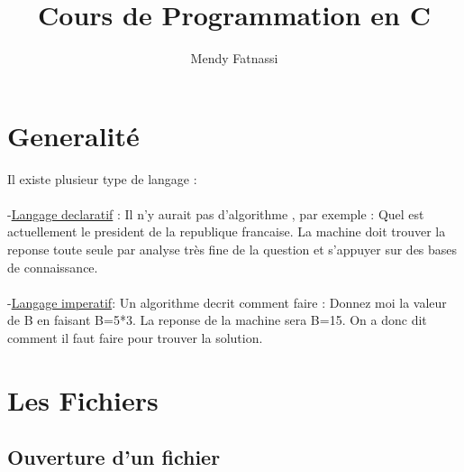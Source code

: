 \documentclass[a4paper,12pt,openany]{book}
\author{Mendy Fatnassi}
\title{Cours de Programmation en C}
\begin{document}
\maketitle
\tableofcontents

\chapter{Generalit\'e}

Il existe plusieur type de langage :\\
\\
-\underline{Langage declaratif} : Il n'y aurait pas d'algorithme , par exemple : Quel est actuellement le president de la republique francaise. La machine doit trouver la reponse toute seule par analyse tr\`es fine de la question et s'appuyer sur des bases de connaissance.\\
\\
-\underline{Langage imperatif}: Un algorithme decrit comment faire : Donnez moi la valeur de B en faisant B=5*3. La reponse de la machine sera B=15. On a donc dit comment il faut faire pour trouver la solution.\\




\chapter{Les Fichiers}

\section{Ouverture d'un fichier}
\end{document}
